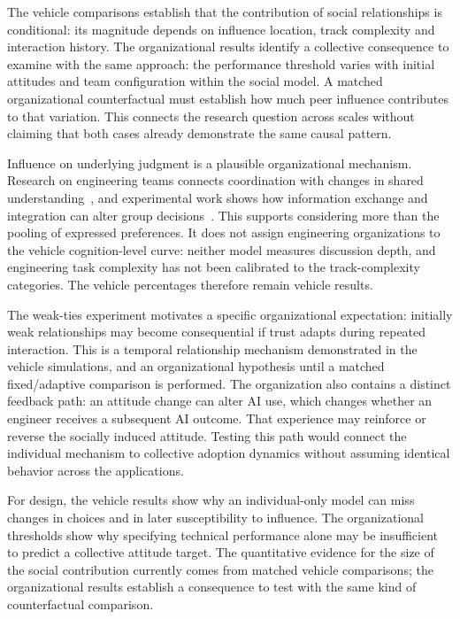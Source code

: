 \documentclass[11pt]{article}
\begin{document}
The vehicle comparisons establish that the contribution of social
relationships is conditional: its magnitude depends on influence location,
track complexity and interaction history. The organizational results identify
a collective consequence to examine with the same approach: the performance
threshold varies with initial attitudes and team configuration within the
social model. A matched organizational counterfactual must establish how much
peer influence contributes to that variation. This connects the research
question across scales without claiming that both cases already demonstrate
the same causal pattern.

Influence on underlying judgment is a plausible organizational mechanism.
Research on engineering teams connects coordination with changes in shared
understanding~\cite{avnet2016}, and experimental work shows how information
exchange and integration can alter group decisions~\cite{vanginkel2008}.
This supports considering more than the pooling of expressed preferences.
It does not assign engineering organizations to the vehicle cognition-level
curve: neither model measures discussion depth, and engineering task
complexity has not been calibrated to the track-complexity categories.
The vehicle percentages therefore remain vehicle results.

The weak-ties experiment motivates a specific organizational expectation:
initially weak relationships may become consequential if trust adapts during
repeated interaction. This is a temporal relationship mechanism demonstrated
in the vehicle simulations, and an organizational hypothesis until a matched
fixed/adaptive comparison is performed. The organization also contains a
distinct feedback path: an attitude change can alter AI use, which changes
whether an engineer receives a subsequent AI outcome. That experience may
reinforce or reverse the socially induced attitude. Testing this path would
connect the individual mechanism to collective adoption dynamics without
assuming identical behavior across the applications.

For design, the vehicle results show why an individual-only model can miss
changes in choices and in later susceptibility to influence. The organizational
thresholds show why specifying technical performance alone may be insufficient
to predict a collective attitude target. The quantitative evidence for the
size of the social contribution currently comes from matched vehicle
comparisons; the organizational results establish a consequence to test with
the same kind of counterfactual comparison.
\end{document}
